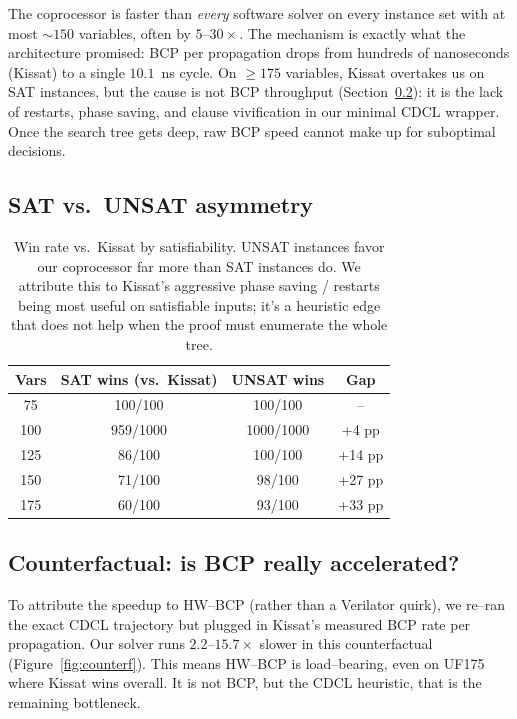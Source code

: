 \documentclass[11pt,letterpaper]{article}
\begin{document}
The coprocessor is faster than \emph{every} software solver on every
instance set with at most $\sim$$150$ variables, often by
$5$--$30\times$. The mechanism is exactly what the architecture
promised: BCP per propagation drops from hundreds of nanoseconds
(Kissat) to a single $10.1$~ns cycle. On $\ge\!\!175$ variables,
Kissat overtakes us on SAT instances, but the cause is not BCP
throughput (Section~\ref{sec:counterfactual}): it is the lack of
restarts, phase saving, and clause vivification in our minimal CDCL
wrapper. Once the search tree gets deep, raw BCP speed cannot make up
for suboptimal decisions.

\subsection{SAT vs.\ UNSAT asymmetry}

\begin{table}[h]
\centering\small
\begin{tabular}{cccc}
\toprule
\textbf{Vars} & \textbf{SAT wins (vs.\ Kissat)} & \textbf{UNSAT wins} & \textbf{Gap}\\
\midrule
75  & 100/100 & 100/100  & --\\
100 & 959/1000 & 1000/1000 & +4 pp\\
125 & 86/100  & 100/100  & +14 pp\\
150 & 71/100  & 98/100   & +27 pp\\
175 & 60/100  & 93/100   & +33 pp\\
\bottomrule
\end{tabular}
\caption{Win rate vs.\ Kissat by satisfiability. UNSAT instances
favor our coprocessor far more than SAT instances do. We attribute
this to Kissat's aggressive phase saving / restarts being most
useful on satisfiable inputs; it's a heuristic edge that does not
help when the proof must enumerate the whole tree.}
\label{tab:sat-unsat}
\end{table}

\subsection{Counterfactual: is BCP really accelerated?}\label{sec:counterfactual}
To attribute the speedup to HW--BCP (rather than a Verilator
quirk), we re--ran the exact CDCL trajectory but plugged in
Kissat's measured BCP rate per propagation. Our solver runs
$2.2$--$15.7\times$ slower in this counterfactual
(Figure~\ref{fig:counterf}). This means HW--BCP is load--bearing, even on
UF175 where Kissat wins overall. It is not BCP, but the CDCL heuristic, that is
the remaining bottleneck.
\end{document}
